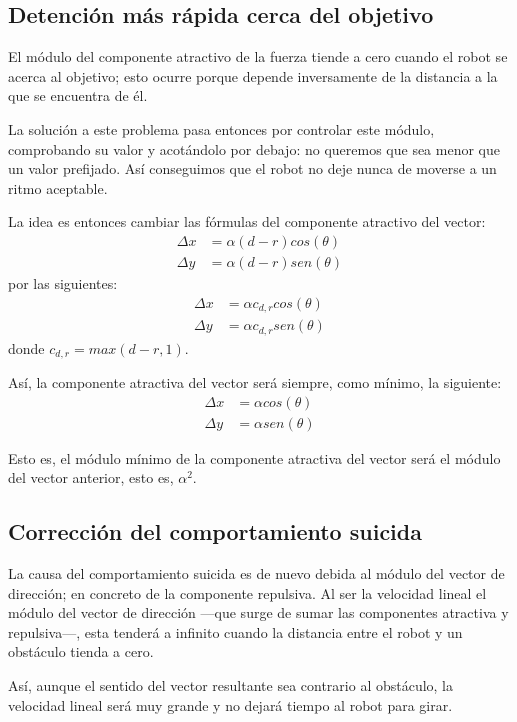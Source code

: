 \documentclass[a4paper, 11pt, titlepage]{article}
\begin{document}
  \subsection{Detención más rápida cerca del objetivo}
    El módulo del componente atractivo de la fuerza tiende a cero cuando el robot se acerca al objetivo; esto ocurre porque depende inversamente de la distancia a la que se encuentra de él.

    La solución a este problema pasa entonces por controlar este módulo, comprobando su valor y acotándolo por debajo: no queremos que sea menor que un valor prefijado. Así conseguimos que el robot no deje nunca de moverse a un ritmo aceptable.

    La idea es entonces cambiar las fórmulas del componente atractivo del vector:
    \begin{align*}
        \Delta x &= \alpha (d-r) cos(\theta) \\
        \Delta y &= \alpha (d-r) sen(\theta)
    \end{align*}
    por las siguientes:
    \begin{align*}
        \Delta x &= \alpha c_{d,r} cos(\theta) \\
        \Delta y &= \alpha c_{d,r} sen(\theta)
    \end{align*}
    donde $c_{d,r} = max(d-r, 1)$.

    Así, la componente atractiva del vector será siempre, como mínimo, la siguiente:
    \begin{align*}
        \Delta x &= \alpha cos(\theta) \\
        \Delta y &= \alpha sen(\theta)
    \end{align*}

    Esto es, el módulo mínimo de la componente atractiva del vector será el módulo del vector anterior, esto es, $\alpha^2$.


  \subsection{Corrección del comportamiento suicida}
    La causa del comportamiento suicida es de nuevo debida al módulo del vector de dirección; en concreto de la componente repulsiva. Al ser la velocidad lineal el módulo del vector de dirección ---que surge de sumar las componentes atractiva y repulsiva---, esta tenderá a infinito cuando la distancia entre el robot y un obstáculo tienda a cero.

    Así, aunque el sentido del vector resultante sea contrario al obstáculo, la velocidad lineal será muy grande y no dejará tiempo al robot para girar.
\end{document}
